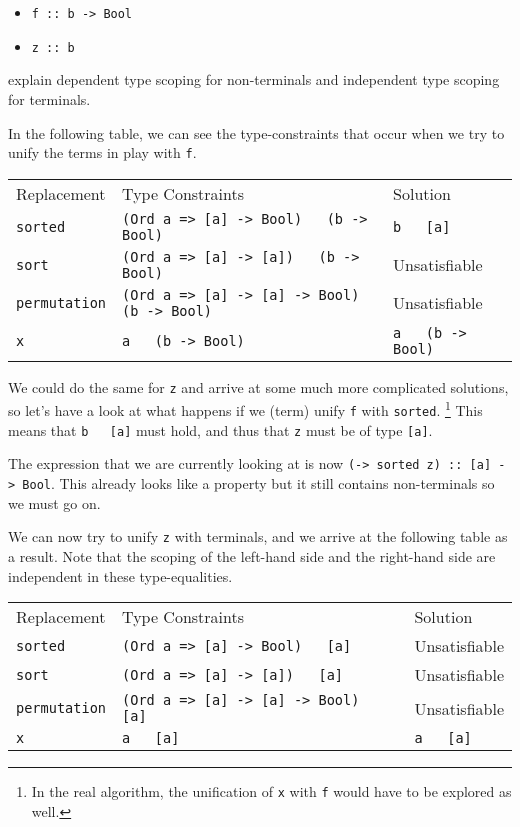 \documentclass[a4paper, 11pt]{article}
\newcommand{\h}[1]{\texttt{#1}}
\newcommand{\TODO}[1]{#1}
\begin{document}
\begin{itemize}
  \item \h{f :: b -> Bool}
  \item \h{z :: b}
\end{itemize}
\TODO{explain dependent type scoping for non-terminals and independent type scoping for terminals.}

In the following table, we can see the type-constraints that occur when we try to unify the terms in play with \h{f}.

\begin{tabular}{lll}
  Replacement & Type Constraints & Solution \\
  \h{sorted} & \h{(Ord a => [a] -> Bool) ~ (b -> Bool)} & \h{b ~ [a]} \\
  \h{sort} & \h{(Ord a => [a] -> [a]) ~ (b -> Bool)} & Unsatisfiable \\
  \h{permutation} & \h{(Ord a => [a] -> [a] -> Bool) ~ (b -> Bool)} & Unsatisfiable \\
  \h{x} & \h{a ~ (b -> Bool)} & \h{a ~ (b -> Bool)} \\
\end{tabular}

We could do the same for \h{z} and arrive at some much more complicated solutions, so let's have a look at what happens if we (term) unify \h{f} with \h{sorted}. \footnote{In the real algorithm, the unification of \h{x} with \h{f} would have to be explored as well.}
This means that \h{b ~ [a]} must hold, and thus that \h{z} must be of type \h{[a]}.

The expression that we are currently looking at is now \h{(\a -> sorted z) :: [a] -> Bool}.
This already looks like a property but it still contains non-terminals so we must go on.

We can now try to unify \h{z} with terminals, and we arrive at the following table as a result.
Note that the scoping of the left-hand side and the right-hand side are independent in these type-equalities.

\begin{tabular}{lll}
  Replacement & Type Constraints & Solution \\
  \h{sorted} & \h{(Ord a => [a] -> Bool) ~ [a]} & Unsatisfiable \\
  \h{sort} & \h{(Ord a => [a] -> [a]) ~ [a]} & Unsatisfiable \\
  \h{permutation} & \h{(Ord a => [a] -> [a] -> Bool) ~ [a]} & Unsatisfiable \\
  \h{x} & \h{a ~ [a]} & \h{a ~ [a]} \\
\end{tabular}
\end{document}
